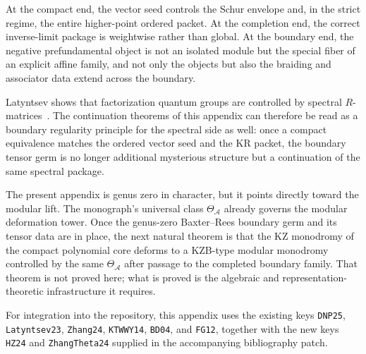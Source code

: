 At the compact end, the vector seed controls the Schur envelope and, in
the strict regime, the entire higher-point ordered packet. At the
completion end, the correct inverse-limit package is weightwise rather
than global. At the boundary end, the negative prefundamental object is
not an isolated module but the special fiber of an explicit affine family,
and not only the objects but also the braiding and associator data extend
across the boundary.

\begin{remark}
\label{rem:relation-factorization-quantum-groups}
Latyntsev shows that factorization quantum groups are controlled by
spectral $R$-matrices~\cite{Latyntsev23}. The continuation theorems of
this appendix can therefore be read as a boundary regularity principle for
the spectral side as well: once a compact equivalence matches the ordered
vector seed and the KR packet, the boundary tensor germ is no longer
additional mysterious structure but a continuation of the same spectral
package.
\end{remark}

\begin{remark}
\label{rem:modular-lift-beyond-boundary}
The present appendix is genus zero in character, but it points directly
toward the modular lift. The monograph's universal class
$\Theta_{\mathcal A}$ already governs the modular deformation tower. Once
the genus-zero Baxter--Rees boundary germ and its tensor data are in
place, the next natural theorem is that the KZ monodromy of the compact
polynomial core deforms to a KZB-type modular monodromy controlled by the
same $\Theta_{\mathcal A}$ after passage to the completed boundary family.
That theorem is not proved here; what is proved is the algebraic and
representation-theoretic infrastructure it requires.
\end{remark}

\begin{remark}
\label{rem:bibliographic-note-typeA-baxter-rees}
For integration into the repository, this appendix uses the existing keys
\texttt{DNP25}, \texttt{Latyntsev23}, \texttt{Zhang24},
\texttt{KTWWY14}, \texttt{BD04}, and \texttt{FG12}, together with the new
keys \texttt{HZ24} and \texttt{ZhangTheta24} supplied in the accompanying
bibliography patch.
\end{remark}
